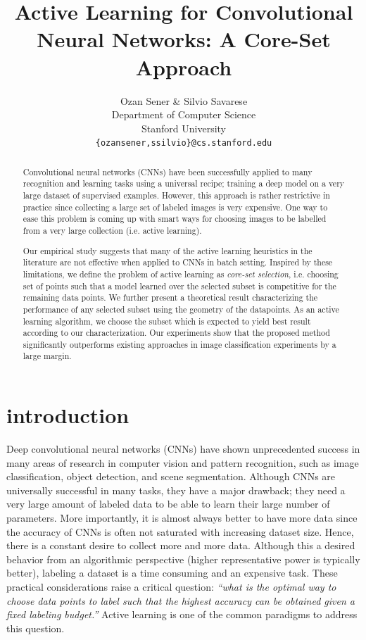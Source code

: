 \documentclass{article} %
\title{Active Learning for Convolutional Neural Networks: A Core-Set Approach}
\author{Ozan Sener \& Silvio Savarese \\
Department of Computer Science\\
Stanford University \\
\texttt{\{ozansener,ssilvio\}@cs.stanford.edu} \\
}
\makeatletter
\newcommand*{\ie}{i.e.\@\xspace}
\makeatother
\begin{document}
\maketitle

\begin{abstract} 
Convolutional neural networks (CNNs) have been successfully applied to many recognition and learning tasks using a universal recipe;
    training a deep model on a very large dataset of supervised examples. However, this approach is rather restrictive in practice since collecting a
    large set of labeled images is very expensive. One way to ease this problem is coming up with smart ways for choosing images to be labelled from a
    very large collection (\ie active learning).

    Our empirical study suggests that many of the active learning heuristics in the literature are not effective when applied to CNNs in batch setting. Inspired by these limitations, we define the problem of active learning as \emph{core-set selection}, \ie choosing set of points such that a model learned over the selected subset is competitive for the remaining data points. We further present a theoretical result characterizing the performance of any selected subset using the geometry of the datapoints. As an active learning algorithm, we choose the subset which is expected to yield best result according to our characterization. Our experiments show that the proposed method significantly outperforms existing approaches in image classification experiments by a large margin. 
\end{abstract} 

\section{introduction}
Deep convolutional neural networks (CNNs) have shown unprecedented success in many areas of research in computer vision and pattern recognition, such as
image classification, object detection, and scene segmentation. Although CNNs are universally successful in many tasks, they have a major drawback;
they need a very large amount of labeled data to be able to learn their large number of parameters. More importantly, it is almost always better to have
more data since the accuracy of CNNs is often not saturated with increasing dataset size. Hence, there is a constant desire to collect more and more
data. Although this a desired behavior from an algorithmic perspective (higher representative power is typically better), labeling a dataset is
a time consuming and an expensive task. These practical considerations raise a critical question: \emph{``what is the optimal way to choose data
points to label such that the highest accuracy can be obtained given a fixed labeling budget.''} Active learning is one of the common paradigms to
address this question.
\end{document}
